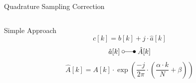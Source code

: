 \documentclass[10pt]{beamer}
\begin{document}
\begin{frame}{Quadrature Sampling Correction}
  \begin{columns}[T]
    \begin{column}{.5\textwidth}
      \begin{block}{Simple Approach}
        \[c[k] = b[k] + j \cdot \hat a[k]\]
        \[\hat a[k] \;\laplace\; \hat A[k] \]
        \[\hat A[k] = A[k]  \cdot \exp\left(
        \frac{-j}{2 \pi} \cdot \left(\frac{\alpha \cdot k}{N} + \beta\right)
        \right)\]
      \end{block}



\end{column}
\end{columns}
\end{frame}
\end{document}
